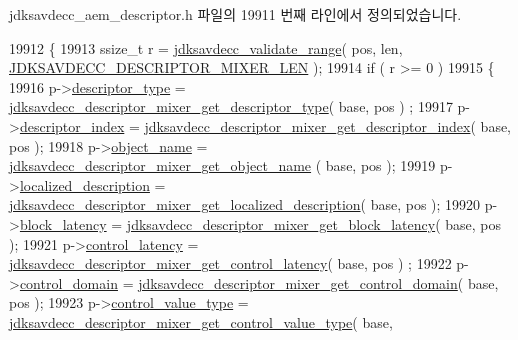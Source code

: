 jdksavdecc\+\_\+aem\+\_\+descriptor.\+h 파일의 19911 번째 라인에서 정의되었습니다.


\begin{DoxyCode}
19912 \{
19913     ssize\_t r = \hyperlink{group__util_ga9c02bdfe76c69163647c3196db7a73a1}{jdksavdecc\_validate\_range}( pos, len, 
      \hyperlink{group__descriptor__mixer_ga54e31d2393566efeee213c24cb777130}{JDKSAVDECC\_DESCRIPTOR\_MIXER\_LEN} );
19914     \textcolor{keywordflow}{if} ( r >= 0 )
19915     \{
19916         p->\hyperlink{structjdksavdecc__descriptor__mixer_ab7c32b6c7131c13d4ea3b7ee2f09b78d}{descriptor\_type} = 
      \hyperlink{group__descriptor__mixer_gae01356ed1dee84ca0063ea01ccf2a0e7}{jdksavdecc\_descriptor\_mixer\_get\_descriptor\_type}( base, pos )
      ;
19917         p->\hyperlink{structjdksavdecc__descriptor__mixer_a042bbc76d835b82d27c1932431ee38d4}{descriptor\_index} = 
      \hyperlink{group__descriptor__mixer_ga21b50932f50ee468878b28d9dca98c14}{jdksavdecc\_descriptor\_mixer\_get\_descriptor\_index}( base, pos
       );
19918         p->\hyperlink{structjdksavdecc__descriptor__mixer_a7d1f5945a13863b1762fc6db74fa8f80}{object\_name} = \hyperlink{group__descriptor__mixer_gabf989a189d4d3b53f468fed26860bec6}{jdksavdecc\_descriptor\_mixer\_get\_object\_name}
      ( base, pos );
19919         p->\hyperlink{structjdksavdecc__descriptor__mixer_a0926f846ca65a83ad5bb06b4aff8f408}{localized\_description} = 
      \hyperlink{group__descriptor__mixer_gafc03dd5a79e12367dfddb5047d7a26e7}{jdksavdecc\_descriptor\_mixer\_get\_localized\_description}(
       base, pos );
19920         p->\hyperlink{structjdksavdecc__descriptor__mixer_ae2e9f0088d5e900b610d1b2818dfc559}{block\_latency} = 
      \hyperlink{group__descriptor__mixer_ga46a54db0b03d4891da41685f128a8a64}{jdksavdecc\_descriptor\_mixer\_get\_block\_latency}( base, pos );
19921         p->\hyperlink{structjdksavdecc__descriptor__mixer_ab2bd4639caaf9a8078b68368afbd63b6}{control\_latency} = 
      \hyperlink{group__descriptor__mixer_ga41c1e5952dbbf89e8066f321a9f83fdd}{jdksavdecc\_descriptor\_mixer\_get\_control\_latency}( base, pos )
      ;
19922         p->\hyperlink{structjdksavdecc__descriptor__mixer_a8937b22996b7c28ae209f29fe777f03a}{control\_domain} = 
      \hyperlink{group__descriptor__mixer_ga4433959abad55c62b5393a1058eaf8b5}{jdksavdecc\_descriptor\_mixer\_get\_control\_domain}( base, pos );
19923         p->\hyperlink{structjdksavdecc__descriptor__mixer_a62a5b88a920cc4d09508de6fc60d9a63}{control\_value\_type} = 
      \hyperlink{group__descriptor__mixer_gad5688e7d9672f19c0a78894c2b4f60e9}{jdksavdecc\_descriptor\_mixer\_get\_control\_value\_type}( base,

\end{DoxyCode}
